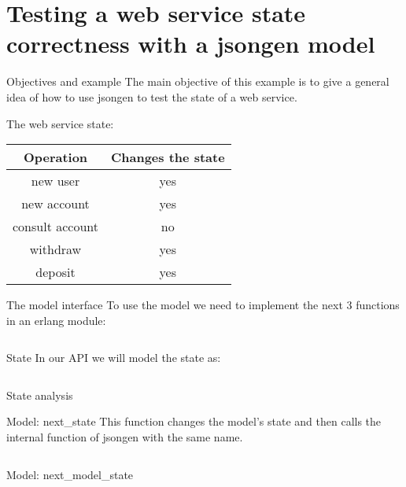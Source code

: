 \section{Testing a web service state correctness with a jsongen model}

\begin{frame}{Objectives and example}
  The main objective of this example is to give a general idea of how
  to use jsongen to test the state of a web service.

  The web service state:\\

  \centering
  \begin{tabular}{| c | c |}
    \hline
    \textbf{Operation}   & \textbf{Changes the state} \\ \hline
    new user    & yes \\ \hline
    new account & yes \\ \hline
    consult account & no \\ \hline
    withdraw    & yes \\ \hline
    deposit     & yes \\ \hline
  \end{tabular}
  \centering
\end{frame}

\begin{frame}{The model interface}
  To use the model we need to implement the next 3 functions in an
  erlang module:

  \inputminted{erlang}{./code/interface.erl}
\end{frame}

\begin{frame}{State}
  In our API we will model the state as:

  \inputminted{erlang}{./code/state.erl}
\end{frame}

\begin{frame}{State analysis}
\end{frame}

\begin{frame}{Model: next\_state}
  This function changes the model's state and then calls the internal
  function of jsongen with the same name.

  \inputminted{erlang}{./code/next_state.erl}
\end{frame}

\begin{frame}{Model: next\_model\_state}
  \inputminted{erlang}{./code/next_model_state.erl}
\end{frame}

